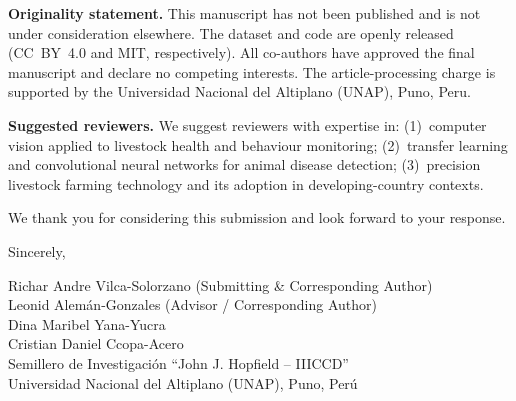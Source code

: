 \documentclass[12pt, letterpaper]{article}
\begin{document}
\textbf{Originality statement.}
This manuscript has not been published and is not under consideration elsewhere.
The dataset and code are openly released (CC~BY~4.0 and MIT, respectively).
All co-authors have approved the final manuscript and declare no competing interests.
The article-processing charge is supported by the Universidad Nacional del Altiplano
(UNAP), Puno, Peru.

\textbf{Suggested reviewers.}
We suggest reviewers with expertise in:
(1)~computer vision applied to livestock health and behaviour monitoring;
(2)~transfer learning and convolutional neural networks for animal disease detection;
(3)~precision livestock farming technology and its adoption in developing-country contexts.

We thank you for considering this submission and look forward to your response.

Sincerely,

\vspace{1.5cm}

Richar Andre Vilca-Solorzano (Submitting \& Corresponding Author)\\[4pt]
Leonid Alem\'an-Gonzales (Advisor / Corresponding Author)\\[4pt]
Dina Maribel Yana-Yucra\\
Cristian Daniel Ccopa-Acero\\[6pt]
Semillero de Investigaci\'on ``John J. Hopfield -- IIICCD''\\
Universidad Nacional del Altiplano (UNAP), Puno, Per\'u
\end{document}

